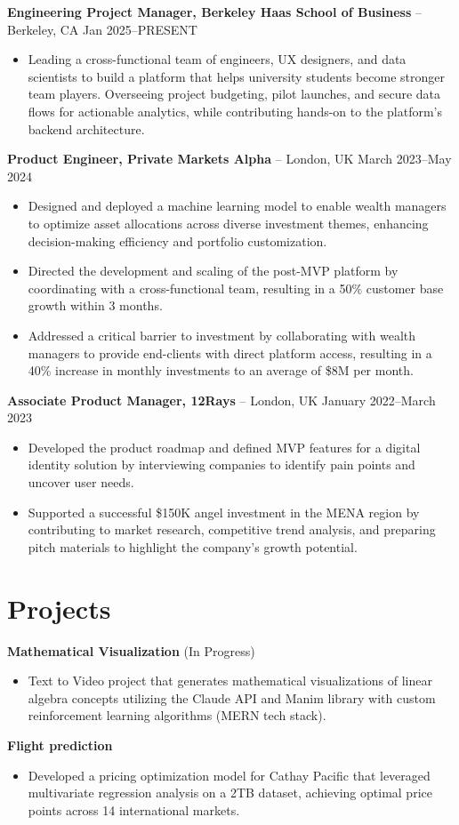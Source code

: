 \documentclass{article}
\begin{document}
\textbf{Engineering Project Manager, Berkeley Haas School of Business} -- Berkeley, CA \hfill Jan 2025--PRESENT
\begin{itemize}[leftmargin=*, noitemsep]
\item Leading a cross-functional team of engineers, UX designers, and data scientists to build a platform that helps university students become stronger team players. Overseeing project budgeting, pilot launches, and secure data flows for actionable analytics, while contributing hands-on to the platform's backend architecture.
\end{itemize}

\textbf{Product Engineer, Private Markets Alpha} -- London, UK \hfill March 2023--May 2024
\begin{itemize}[leftmargin=*, noitemsep]
\item Designed and deployed a machine learning model to enable wealth managers to optimize asset allocations across diverse investment themes, enhancing decision-making efficiency and portfolio customization.
\item Directed the development and scaling of the post-MVP platform by coordinating with a cross-functional team, resulting in a 50\% customer base growth within 3 months.
\item Addressed a critical barrier to investment by collaborating with wealth managers to provide end-clients with direct platform access, resulting in a 40\% increase in monthly investments to an average of \$8M per month.
\end{itemize}

\textbf{Associate Product Manager, 12Rays} -- London, UK \hfill January 2022--March 2023
\begin{itemize}[leftmargin=*, noitemsep]
\item Developed the product roadmap and defined MVP features for a digital identity solution by interviewing companies to identify pain points and uncover user needs.
\item Supported a successful \$150K angel investment in the MENA region by contributing to market research, competitive trend analysis, and preparing pitch materials to highlight the company's growth potential.
\end{itemize}

\section*{Projects}
\textbf{Mathematical Visualization} (In Progress)
\begin{itemize}[leftmargin=*, noitemsep]
\item Text to Video project that generates mathematical visualizations of linear algebra concepts utilizing the Claude API and Manim library with custom reinforcement learning algorithms (MERN tech stack).
\end{itemize}

\textbf{Flight prediction}
\begin{itemize}[leftmargin=*, noitemsep]
\item Developed a pricing optimization model for Cathay Pacific that leveraged multivariate regression analysis on a 2TB dataset, achieving optimal price points across 14 international markets.
\end{itemize}
\end{document}
